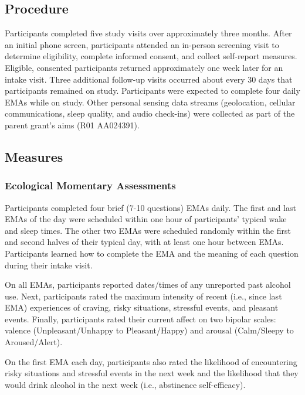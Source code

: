 \documentclass[
]{agujournal2019}
\begin{document}
\subsection{Procedure}\label{procedure}

Participants completed five study visits over approximately three
months. After an initial phone screen, participants attended an
in-person screening visit to determine eligibility, complete informed
consent, and collect self-report measures. Eligible, consented
participants returned approximately one week later for an intake visit.
Three additional follow-up visits occurred about every 30 days that
participants remained on study. Participants were expected to complete
four daily EMAs while on study. Other personal sensing data streams
(geolocation, cellular communications, sleep quality, and audio
check-ins) were collected as part of the parent grant's aims (R01
AA024391).

\subsection{Measures}\label{measures}

\subsubsection{Ecological Momentary
Assessments}\label{ecological-momentary-assessments}

Participants completed four brief (7-10 questions) EMAs daily. The first
and last EMAs of the day were scheduled within one hour of participants'
typical wake and sleep times. The other two EMAs were scheduled randomly
within the first and second halves of their typical day, with at least
one hour between EMAs. Participants learned how to complete the EMA and
the meaning of each question during their intake visit.

On all EMAs, participants reported dates/times of any unreported past
alcohol use. Next, participants rated the maximum intensity of recent
(i.e., since last EMA) experiences of craving, risky situations,
stressful events, and pleasant events. Finally, participants rated their
current affect on two bipolar scales: valence (Unpleasant/Unhappy to
Pleasant/Happy) and arousal (Calm/Sleepy to Aroused/Alert).

On the first EMA each day, participants also rated the likelihood of
encountering risky situations and stressful events in the next week and
the likelihood that they would drink alcohol in the next week (i.e.,
abstinence self-efficacy).
\end{document}
